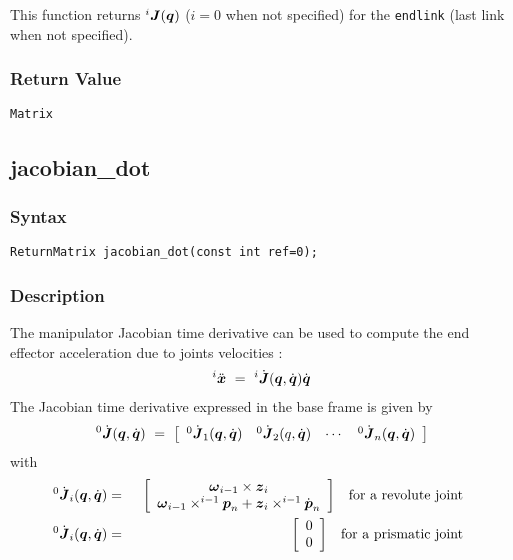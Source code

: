 \documentclass[11pt,fleqn,letterpaper]{report}
\newcommand{\mbold}[1]{\mbox{\boldmath $ #1 $}}
\begin{document}
This function returns ${}^i \mbold{J}(\mbold{q})$ ($i=0$ when not
specified) for the \texttt{endlink} (last link when not specified).



\subsubsection*{Return Value}

{\tt Matrix}

\newpage


\subsection*{jacobian\_dot}
\subsubsection*{Syntax}
\begin{verbatim}
ReturnMatrix jacobian_dot(const int ref=0);
\end{verbatim}
\subsubsection*{Description}   
The manipulator Jacobian time derivative can be used to compute the end effector acceleration due to joints velocities \cite{Angeles97}:
\begin{eqnarray}
  ^i\ddot{\mbold{x}}\ =\  ^i\dot{\mbold{J}}(\mbold{q},\dot{\mbold{q}})\dot{\mbold{q}}
\end{eqnarray}
The Jacobian time derivative expressed in the base frame is given by \cite{Angeles97}
\begin{eqnarray}
  ^0\dot{\mbold{J}}(\mbold{q},\dot{\mbold{q}})\ =\ 
  \left[
    \begin{array}{cccc}
      ^0\dot{\mbold{J}}_1(\mbold{q},\dot{\mbold{q}}) & ^0\dot{\mbold{J}}_2(q,\dot{\mbold{q}}) 
      & \cdots & ^0\dot{\mbold{J}}_n(\mbold{q},\dot{\mbold{q}})
    \end{array}
  \right]
\end{eqnarray}
with
\begin{eqnarray}
  ^0\dot{\mbold{J}}_i(\mbold{q},\dot{\mbold{q}}) &=&
  \begin{array}{cc}
    \left[
      \begin{array}{c}
        \mbold{\omega}_{i-1}\times \mbold{z}_i \\
        \mbold{\omega}_{i-1}\times ^{i-1}\mbold{p}_n + \mbold{z}_i\times ^{i-1}\dot{\mbold{p}}_n
      \end{array}
    \right]  & \textrm{for a revolute joint}
  \end{array} \\
  ^0\dot{\mbold{J}}_i(\mbold{q},\dot{\mbold{q}}) &=&
  \begin{array}{cc}
    \left[
      \begin{array}{c}
        0 \\
        0
      \end{array}
    \right]  & \textrm{for a prismatic joint}
  \end{array}
\end{eqnarray}
\end{document}
